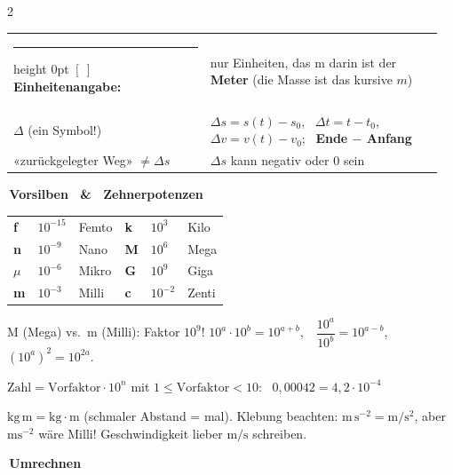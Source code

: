 \documentclass[8pt,a4paper]{extarticle}
\makeatletter
\newcommand{\T}[1]{%
  \vspace{2.2mm plus 0.6mm}%
  \noindent\colorbox{ak}{\color{white}\bfseries\small\,#1\,}\par
  \vspace{0.8mm}\nobreak\ignorespaces}
\newcommand{\FT}[1]{%
  \begin{tabular}{@{}>{\raggedright\arraybackslash}p{0.44\linewidth}@{\hspace{3pt}}>{\raggedright\arraybackslash}p{0.52\linewidth}@{}}
  #1\end{tabular}\par}
\newcommand{\RT}[2]{%
  \begin{tabular}{@{}#1@{}}#2\end{tabular}\par}
\newcommand{\hk}[1]{\textcolor{ak}{\textbf{#1}}}
\makeatother
\begin{document}
\begin{multicols}{2}
\vspace{1mm}
\FT{
\hrule height 0pt
\hk{$[\ ]$ Einheitenangabe:} & nur Einheiten, das $\mathrm{m}$ darin ist der \textbf{Meter} (die Masse ist das kursive $m$) \\[0.6mm]
$\Delta$ (ein Symbol!) & $\Delta s = s(t)-s_0$, \ $\Delta t = t-t_0$, \ $\Delta v = v(t)-v_0$; \ \textbf{Ende $-$ Anfang} \\
«zurückgelegter Weg» $\neq \Delta s$ & $\Delta s$ kann negativ oder $0$ sein \\
}

\T{Vorsilben \ \& \ Zehnerpotenzen}

\RT{@{}l@{\ }l@{\ }l@{\hspace{2.5mm}}l@{\ }l@{\ }l@{}}{
\hk{f} & $10^{-15}$ & Femto & \hk{k} & $10^{3}$ & Kilo \\
\hk{n} & $10^{-9}$ & Nano & \hk{M} & $10^{6}$ & Mega \\
$\mu$ & $10^{-6}$ & Mikro & \hk{G} & $10^{9}$ & Giga \\
\hk{m} & $10^{-3}$ & Milli & \hk{c} & $10^{-2}$ & Zenti \\
}

\vspace{0.8mm}
$\mathrm{M}$ (Mega) vs.\ $\mathrm{m}$ (Milli): Faktor $10^9$! \quad $10^a\cdot10^b=10^{a+b}$,\ \ $\dfrac{10^a}{10^b}=10^{a-b}$,\ \ $(10^a)^2=10^{2a}$.

\vspace{0.8mm}
$\text{Zahl} = \text{Vorfaktor}\cdot 10^{n}$ mit $1 \le \text{Vorfaktor} < 10$: \ $0{,}00042 = 4{,}2\cdot10^{-4}$

\vspace{0.8mm}
$\mathrm{kg\,m} = \mathrm{kg}\cdot\mathrm{m}$ (schmaler Abstand = mal). Klebung beachten: $\mathrm{m\,s^{-2}} = \mathrm{m/s^2}$, aber $\mathrm{ms^{-2}}$ wäre Milli! Geschwindigkeit lieber $\mathrm{m/s}$ schreiben.

\T{Umrechnen}


\end{multicols}
\end{document}
